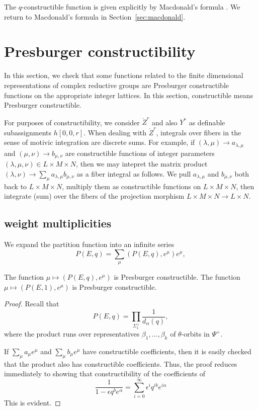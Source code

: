 The $q$-constructible function is given explicitly by Macdonald's formula \cite{casselman1980unramified}.
We return to Macdonald's formula in Section~\ref{sec:macdonald}.


\section{Presburger constructibility}

In this section,
we check that some functions related to the finite dimensional representations of complex reductive groups
are Presburger constructible functions on the appropriate integer lattices.  In this section, constructible means Presburger
constructible.

\begin{remark}\label{rem:matrix}
For purposes of constructibility, we consider $\ring{Z}^r$ and also $Y^*$ as 
definable subassignments $h[0,0,r]$. When dealing with $\ring{Z}^r$, integrals over fibers
in the sense of motivic integration are discrete sums.  For example, if $(\lambda,\mu)\to a_{\lambda,\mu}$
and $(\mu,\nu)\to b_{\mu,\nu}$ are constructible functions of integer parameters $(\lambda,\mu,\nu)\in L\times M\times N$,
then we may intepret the matrix product $(\lambda,\nu)\to \sum_{\mu} a_{\lambda,\mu} b_{\mu,\nu}$ as a
fiber integral as follows.  We pull $a_{\lambda,\mu}$ and $b_{\mu,\nu}$ both back to $L\times M\times N$, multiply
them as constructible functions on $L\times M\times N$, then integrate (sum) over the fibers of the projection morphism
$L\times M\times N\to L\times N$.
\end{remark}




\subsection{weight multiplicities}

We expand the partition function into an infinite series
\[
P(E,q) = \sum_\mu (P(E,q),e^\mu) e^{\mu},
\]

\begin{lemma}\label{lemma:partition}
The function $\mu\mapsto (P(E,q),e^\mu)$ is Presburger constructible.
The function $\mu\mapsto (P(E,1),e^\mu)$ is Presburger constructible.
\end{lemma}

\begin{proof} 
Recall that
\[
P(E,q) = \prod_{\Sigma_1^+} \frac{1}{d_\alpha(q)},
\]
where the product runs over representatives $\beta_1,\ldots,\beta_k$ of $\theta$-orbits in $\Psi^+$.

If $\sum_\mu a_\mu e^\mu$ and $\sum_\mu b_\mu e^\mu$ have constructible coefficients, then it is
easily checked that the product also has constructible coefficients.  Thus, the proof reduces immediately
to showing that constructibility of the coefficients of 
\[
\frac{1}{1-\epsilon q^b e^\alpha} = \sum_{i=0}^\infty \epsilon^i q^{i b} e^{i\alpha}
\]
This is evident.
\end{proof}

